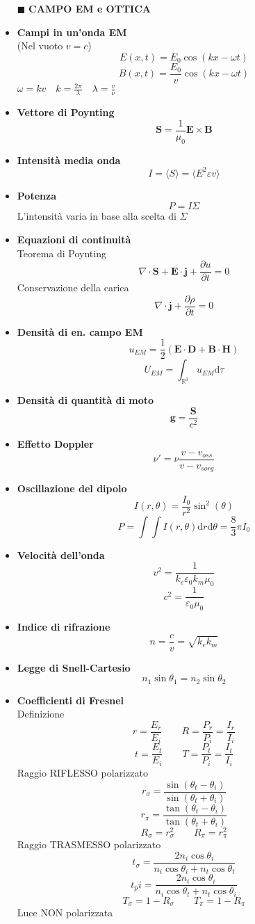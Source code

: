 \documentclass{book}
\newcommand{\g}{\textbf}
\newcommand{\h}{\mathbf}
\newcommand{\e}{\begin{equation}}
\newcommand{\ex}{\end{equation} }
\renewcommand{\it}{\item[$\cdot$]}
\begin{document}
\begin{multicols}{4}
\begin{itemize}
\newpage
\hline
\item [$\blacksquare$] \g{CAMPO EM e OTTICA}
    \it \g{Campi in un'onda EM} \\
        (Nel vuoto $v=c$)
        \e{E(x,t)=E_0\cos(kx-\omega t)} \ex
        \e{B(x,t)=\frac{E_0}{v}\cos(kx-\omega t)} \ex
        $\omega=kv \quad k=\frac{2\pi}{\lambda} \quad \lambda=\frac{v}{\nu}$ \\
    \it \g{Vettore di Poynting}
        \e{\h{S}=\frac{1}{\mu_0}\h{E}\times\h{B}} \ex
    \it \g{Intensità media onda}
        \e{I=\langle S\rangle=\langle E^2\varepsilon v\rangle} \ex
    \it \g{Potenza}
        \e{P=I\Sigma} \ex
        L'intensità varia in base alla scelta di $\Sigma$ 
    \it \g{Equazioni di continuità} \\
        Teorema di Poynting
        \e{\nabla\cdot \h{S}+\h{E}\cdot\h{j}+\frac{\partial u}{\partial t}=0 } \ex
        Conservazione della carica
        \e{\nabla\cdot\h{j}+\frac{\partial \rho}{\partial t}=0} \ex
    \it \g{Densità di en. campo EM}
        \e{u_{EM}=\frac{1}{2}(\h{E}\cdot\h{D}+\h{B}\cdot\h{H})} \ex
        \e{U_{EM}=\int_{\mathbb{R}^3}u_{EM} \mathrm{d}\tau} \ex
    \it \g{Densità di quantità di moto}
        \e{\h{g}=\frac{\h{S}}{c^2}} \ex
    \it \g{Effetto Doppler}
        \e{\nu'=\nu\frac{v-v_{oss}}{v-v_{sorg}}} \ex
    \it \g{Oscillazione del dipolo}
        \e{I(r,\theta)=\frac{I_0}{r^2}\sin^2(\theta)} \ex
        \e{P=\int \int I(r,\theta) \mathrm{d}r \mathrm{d}\theta=\frac{8}{3}\pi I_0}\ex
    \it \g{Velocità dell'onda}
        \e{v^2=\frac{1}{k_e \varepsilon_0 k_m \mu_0}} \ex
        \e{c^2=\frac{1}{\varepsilon_0 \mu_0}} \ex
    \it \g{Indice di rifrazione}
        \e{n=\frac{c}{v}=\sqrt{k_ek_m}} \ex
    \it \g{Legge di Snell-Cartesio}
        \e{n_1 \sin\theta_1=n_2 \sin\theta_2} \ex
    \it \g{Coefficienti di Fresnel} \\
        Definizione
        \e{r=\frac{E_r}{E_i} \qquad R=\frac{P_r}{P_i}=\frac{I_r}{I_i}} \ex
        \e{t=\frac{E_t}{E_i} \qquad T=\frac{P_t}{P_i}=\frac{I_t}{I_i}} \ex
        Raggio RIFLESSO polarizzato
        \e{r_\sigma=\frac{\sin(\theta_t-\theta_i)}{\sin(\theta_t+\theta_i)}} \ex
        \e{r_\pi=\frac{\tan(\theta_t-\theta_i)}{\tan(\theta_t+\theta_i)}} \ex
        \e{R_\sigma=r_\sigma^2 \qquad R_\pi=r_\pi^2} \ex
        Raggio TRASMESSO polarizzato
        \e{t_\sigma=\frac{2n_i\cos\theta_i}{n_i\cos\theta_i+n_t\cos\theta_t}} \ex
        \e{t_pi=\frac{2n_i\cos\theta_i}{n_i\cos\theta_t+n_t\cos\theta_i}} \ex
        \e{T_\sigma=1-R_\sigma \qquad T_\pi=1-R_\pi} \ex
        Luce NON polarizzata

\end{itemize}
\end{multicols}
\end{document}
